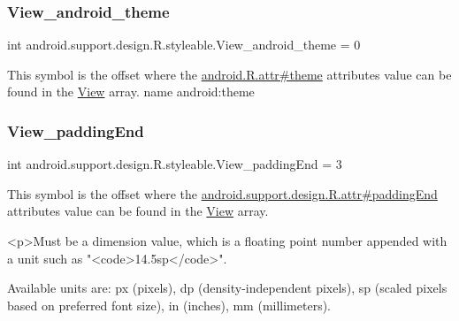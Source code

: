 \subsubsection{\texorpdfstring{View\+\_\+android\+\_\+theme}{View\_android\_theme}}
{\footnotesize\ttfamily int android.\+support.\+design.\+R.\+styleable.\+View\+\_\+android\+\_\+theme = 0\hspace{0.3cm}{\ttfamily [static]}}

This symbol is the offset where the \hyperlink{}{android.\+R.\+attr\#theme} attribute\textquotesingle{}s value can be found in the \hyperlink{classandroid_1_1support_1_1design_1_1R_1_1styleable_ae848bcf5b638b9248537d28ebf90c67f}{View} array.  name android\+:theme \mbox{\label{classandroid_1_1support_1_1design_1_1R_1_1styleable_afd6c00810c12a8e9da050dd3fc5d31ff}} 
\subsubsection{\texorpdfstring{View\+\_\+padding\+End}{View\_paddingEnd}}
{\footnotesize\ttfamily int android.\+support.\+design.\+R.\+styleable.\+View\+\_\+padding\+End = 3\hspace{0.3cm}{\ttfamily [static]}}

This symbol is the offset where the \hyperlink{classandroid_1_1support_1_1design_1_1R_1_1attr_ae87ba13c61369d6cb142278630e1ae38}{android.\+support.\+design.\+R.\+attr\#padding\+End} attribute\textquotesingle{}s value can be found in the \hyperlink{classandroid_1_1support_1_1design_1_1R_1_1styleable_ae848bcf5b638b9248537d28ebf90c67f}{View} array.

\begin{DoxyVerb}      <p>Must be a dimension value, which is a floating point number appended with a unit such as "<code>14.5sp</code>".
\end{DoxyVerb}
 Available units are\+: px (pixels), dp (density-\/independent pixels), sp (scaled pixels based on preferred font size), in (inches), mm (millimeters). 

